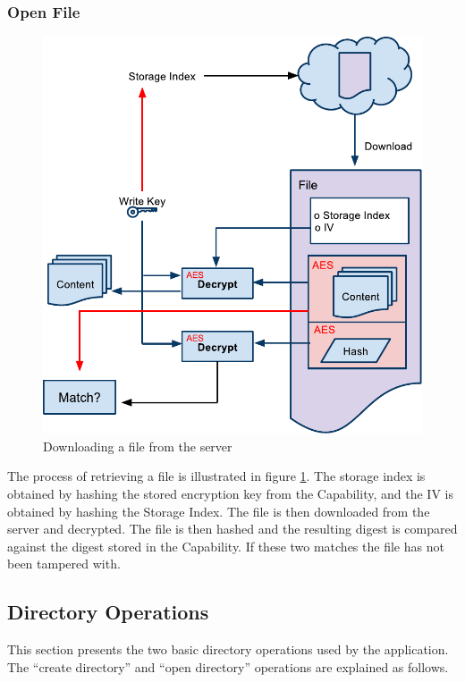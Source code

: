 \documentclass[pdftex,english,10pt,b5paper,twoside]{book}
\begin{document}
\subsubsection{Open File}
\label{sec:CS:OF}
\begin{figure}[h!]
    \centering
    \includegraphics[width=\columnwidth]{CryptoOpenFile.pdf}
    \caption{Downloading a file from the server}
    \label{fig:CS:OF}
\end{figure}

The process of retrieving a file is illustrated in figure \ref{fig:CS:OF}. The
storage index is obtained by hashing the stored encryption key from the
Capability, and the \ac{IV} is obtained by hashing the Storage Index. The file
is then downloaded from the server and decrypted. The file is then hashed and
the resulting digest is compared against the digest stored in the Capability.
If these two matches the file has not been tampered with.

\subsection{Directory Operations}
\label{sec:CS:DO}

This section presents the two basic directory operations used by the
application. The ``create directory'' and ``open directory'' operations are
explained as follows.
\end{document}
